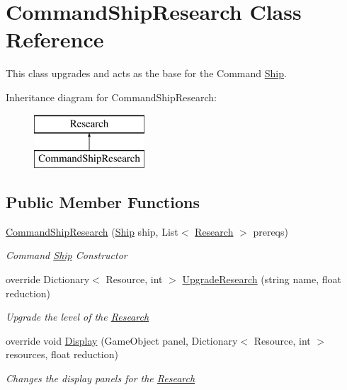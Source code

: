 \hypertarget{class_command_ship_research}{}\section{Command\+Ship\+Research Class Reference}
\label{class_command_ship_research}


This class upgrades and acts as the base for the Command \hyperlink{class_ship}{Ship}.  


Inheritance diagram for Command\+Ship\+Research\+:\begin{figure}[H]
\begin{center}
\leavevmode
\includegraphics[height=2.000000cm]{class_command_ship_research}
\end{center}
\end{figure}
\subsection*{Public Member Functions}
\begin{DoxyCompactItemize}
\item 
\hyperlink{class_command_ship_research_ae7b8818db1baff5897f6561e8e18e739}{Command\+Ship\+Research} (\hyperlink{class_ship}{Ship} ship, List$<$ \hyperlink{class_research}{Research} $>$ prereqs)
\begin{DoxyCompactList}\small\item\em Command \hyperlink{class_ship}{Ship} Constructor \end{DoxyCompactList}\item 
override Dictionary$<$ Resource, int $>$ \hyperlink{class_command_ship_research_a17c455c45c0551795ed2dac84d10a9b2}{Upgrade\+Research} (string name, float reduction)
\begin{DoxyCompactList}\small\item\em Upgrade the level of the \hyperlink{class_research}{Research} \end{DoxyCompactList}\item 
override void \hyperlink{class_command_ship_research_aa8393ffcf2b144a67686e1c1486a7848}{Display} (Game\+Object panel, Dictionary$<$ Resource, int $>$ resources, float reduction)
\begin{DoxyCompactList}\small\item\em Changes the display panels for the \hyperlink{class_research}{Research} \end{DoxyCompactList}\end{DoxyCompactItemize}
